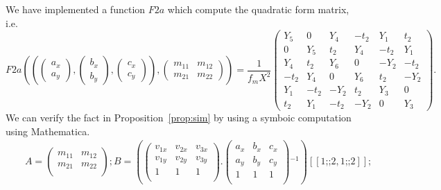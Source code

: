 \documentclass[8pt]{article}
\begin{document}
\begin{screen}
 We have implemented a function $F2a$ which compute the
 quadratic form matrix, i.e.
 {\small
$$
F2a(
\left(
\left( \begin{array}{c} a_{x} \\ a_{y} \end{array} \right),
\left( \begin{array}{c} b_{x} \\ b_{y} \end{array} \right),
\left( \begin{array}{c} c_{x} \\ c_{y} \end{array} \right)
\right),
\left(
\begin{array}{cc}
 m_{11} & m_{12} \\
 m_{21} & m_{22}
\end{array}
\right)
) = 
\frac{1}{f_m X^2}
\left(
 \begin{array}{cccccc}
  Y_5 & 0 & Y_4 & -t_2 & Y_1 & t_2 \\
  0 & Y_5 & t_2 & Y_4 & -t_2 & Y_1 \\
  Y_4 & t_2 & Y_6 & 0 & -Y_2 & -t_2 \\
  -t_2 & Y_4 & 0 & Y_6 & t_2 & -Y_2 \\
  Y_1 & -t_2 & -Y_2 & t_2 & Y_3 & 0 \\
  t_2 & Y_1 & -t_2 & -Y_2 & 0 & Y_3
 \end{array}
\right).
$$}
We can verify the fact in Proposition~\ref{prop:sim}
by using a symboic computation using Mathematica.
\begin{eqnarray*}
&&A=\left(
\begin{array}{cc}
 m_{11} & m_{12} \\
 m_{21} & m_{22} \\
\end{array}
\right);B=\left(\left(
\begin{array}{ccc}
 v_{1 x} & v_{2 x} & v_{3 x} \\
 v_{1 y} & v_{2 y} & v_{3 y} \\
 1 & 1 & 1 \\
\end{array}
\right).\left(
\begin{array}{ccc}
 a_x & b_x & c_x \\
 a_y & b_y & c_y \\
 1 & 1 & 1 \\
\end{array}
\right){}^{-1}\right)[[1\text{;;}2,1\text{;;}2]]; \\

\end{eqnarray*}
\end{screen}
\end{document}

